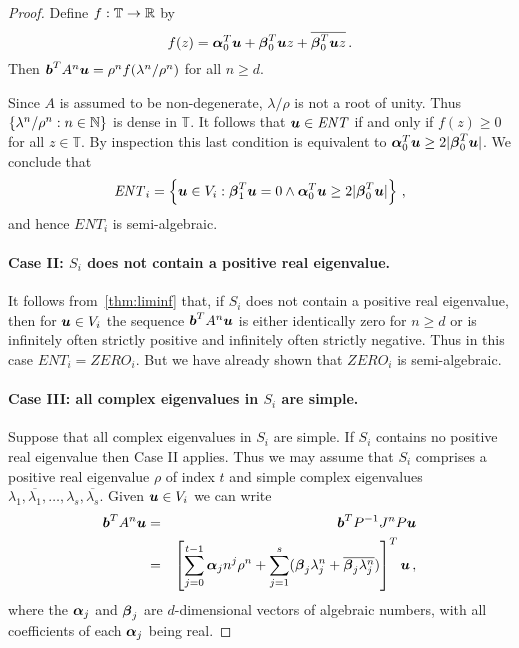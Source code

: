 \begin{proof}
Define $f:\mathbb{T}\rightarrow\mathbb{R}$ by
\[ f(z)=\boldsymbol{\alpha}_0^T\boldsymbol{u}+
\boldsymbol{\beta}_0^T\boldsymbol{u}z+
\overline{\boldsymbol{\beta}_0^T\boldsymbol{u}z} \, .\]
Then $\boldsymbol{b}^TA^n\boldsymbol{u} = \rho^n f(\lambda^n/\rho^n)$ for all $n\geq d$.

Since $A$ is assumed to be non-degenerate, $\lambda/\rho$ is not a
root of unity.  Thus $\lbrace \lambda^n/\rho^n:n\in\mathbb{N}\rbrace$ is dense in
$\mathbb{T}$.  It follows that $\boldsymbol{u}\in\mathit{ENT}$ if and
only if $f(z)\geq 0$ for all $z\in\mathbb{T}$.  By inspection this
last condition is equivalent to $\boldsymbol{\alpha}_0^T\boldsymbol{u}
\geq 2|\boldsymbol{\beta}_0^T\boldsymbol{u}|$.
We conclude that
\[ \mathit{ENT}_i = \left\lbrace \boldsymbol{u}\in V_i :
\boldsymbol{\beta}_1^T\boldsymbol{u}=0 \wedge
\boldsymbol{\alpha}_0^T\boldsymbol{u} \geq 2|\boldsymbol{\beta}_0^T\boldsymbol{u}| \right\rbrace \, ,\]
and hence $\mathit{ENT}_i$ is semi-algebraic.

\paragraph{Case II: $S_i$ does not contain a positive real eigenvalue.}
It follows from~\cref{thm:liminf} that, if $S_i$ does not contain a
positive real eigenvalue, then for $\boldsymbol{u}\in V_i$ the sequence
$\boldsymbol{b}^TA^n\boldsymbol{u}$ is either identically zero for $n\geq
d$ or is infinitely often strictly positive and infinitely often
strictly negative.  Thus in this case
$\mathit{ENT}_i=\mathit{ZERO}_i$.  But we have already shown that
$\mathit{ZERO}_i$ is semi-algebraic.


\paragraph{Case III: all complex eigenvalues in $S_i$ are simple.}
Suppose that all complex eigenvalues in $S_i$ are simple.  If $S_i$
contains no positive real eigenvalue then Case II applies.  Thus we
may assume that $S_i$ comprises a positive real eigenvalue $\rho$ of
index $t$ and simple complex eigenvalues
$\lambda_1,\overline{\lambda_1},\ldots,\lambda_s,\overline{\lambda_s}$.
Given $\boldsymbol{u}\in V_i$ we can write
\begin{eqnarray}
\myvector{b}^TA^n\myvector{u} &=& \myvector{b}^TP^{-1}J^nP\myvector{u}
\notag\\
&=& \left[\sum_{j=0}^{t-1} \myvector{\alpha}_j n^j \rho^n + \sum_{j=1}^s
(\myvector{\beta}_j \lambda_j^n + \overline{\myvector{\beta}_j \lambda^n_j})
\right]^T\myvector{u} \, ,
\label{eq:exp-poly}
\end{eqnarray}
where the $\boldsymbol{\alpha}_j$ and $\boldsymbol{\beta}_j$ are
$d$-dimensional vectors of algebraic numbers, with all coefficients of
each $\boldsymbol{\alpha}_j$ being real.


\end{proof}
